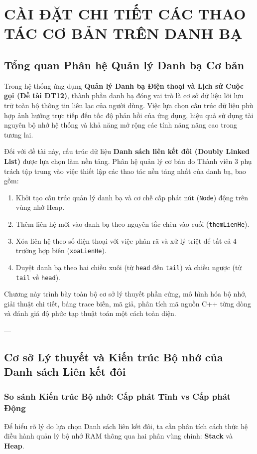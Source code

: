 \documentclass[12pt,a4paper]{report}
\begin{document}
\chapter{CÀI ĐẶT CHI TIẾT CÁC THAO TÁC CƠ BẢN TRÊN DANH BẠ}

\section{Tổng quan Phân hệ Quản lý Danh bạ Cơ bản}
Trong hệ thống ứng dụng \textbf{Quản lý Danh bạ Điện thoại và Lịch sử Cuộc gọi (Đề tài ĐT12)}, thành phần danh bạ đóng vai trò là cơ sở dữ liệu lõi lưu trữ toàn bộ thông tin liên lạc của người dùng. Việc lựa chọn cấu trúc dữ liệu phù hợp ảnh hưởng trực tiếp đến tốc độ phản hồi của ứng dụng, hiệu quả sử dụng tài nguyên bộ nhớ hệ thống và khả năng mở rộng các tính năng nâng cao trong tương lai.

Đối với đề tài này, cấu trúc dữ liệu \textbf{Danh sách liên kết đôi (Doubly Linked List)} được lựa chọn làm nền tảng. Phân hệ quản lý cơ bản do Thành viên 3 phụ trách tập trung vào việc thiết lập các thao tác nền tảng nhất của danh bạ, bao gồm:
\begin{enumerate}
    \item Khởi tạo cấu trúc quản lý danh bạ và cơ chế cấp phát nút (\texttt{Node}) động trên vùng nhớ Heap.
    \item Thêm liên hệ mới vào danh bạ theo nguyên tắc chèn vào cuối (\texttt{themLienHe}).
    \item Xóa liên hệ theo số điện thoại với việc phân rã và xử lý triệt để tất cả 4 trường hợp biên (\texttt{xoaLienHe}).
    \item Duyệt danh bạ theo hai chiều xuôi (từ \texttt{head} đến \texttt{tail}) và chiều ngược (từ \texttt{tail} về \texttt{head}).
\end{enumerate}

Chương này trình bày toàn bộ cơ sở lý thuyết phần cứng, mô hình hóa bộ nhớ, giải thuật chi tiết, bảng trace biến, mã giả, phân tích mã nguồn C++ từng dòng và đánh giá độ phức tạp thuật toán một cách toàn diện.

---

\section{Cơ sở Lý thuyết và Kiến trúc Bộ nhớ của Danh sách Liên kết đôi}

\subsection{So sánh Kiến trúc Bộ nhớ: Cấp phát Tĩnh vs Cấp phát Động}
Để hiểu rõ lý do lựa chọn Danh sách liên kết đôi, ta cần phân tích cách thức hệ điều hành quản lý bộ nhớ RAM thông qua hai phân vùng chính: \textbf{Stack} và \textbf{Heap}.
\end{document}
